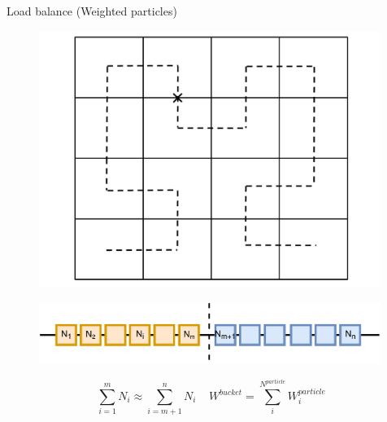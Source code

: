 \documentclass{beamer}
\begin{document}
\begin{frame}{Load balance (Weighted particles)}
\begin{minipage}{0.3 \textwidth}
\begin{figure}
\includegraphics[width=0.99\textwidth]{./PPT/SFC_bucket_decomposition}
\end{figure}
\end{minipage}
\begin{minipage}{0.69 \textwidth}
\begin{figure}
\includegraphics[width=0.99\textwidth]{./PPT/Domain-Decomposition}
\end{figure}
$$
\sum_{i=1}^{m} N_i \approx \sum_{i=m+1}^{n} N_i 
~~~~~
W^{bucket} = \sum_i^{N^{particle}} W_i^{particle}
$$
\end{minipage}


\end{frame}
\end{document}
